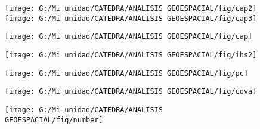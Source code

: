\documentclass[14pt]{beamer}
\begin{document}
\begin{frame}
  \begin{figure}
    \centering
    \texttt{[image: G:/Mi unidad/CATEDRA/ANALISIS GEOESPACIAL/fig/cap2]}
     \texttt{[image: G:/Mi unidad/CATEDRA/ANALISIS GEOESPACIAL/fig/cap3]}
  \end{figure}
\tiny{}
\end{frame}
\begin{frame}
  \begin{figure}
    \centering
    \texttt{[image: G:/Mi unidad/CATEDRA/ANALISIS GEOESPACIAL/fig/cap]}
  \end{figure}
\tiny{}
\end{frame}
\begin{frame}
  \begin{figure}
    \centering
    \texttt{[image: G:/Mi unidad/CATEDRA/ANALISIS GEOESPACIAL/fig/ihs2]}
  \end{figure}
\tiny{}
\end{frame}
\begin{frame}
  \begin{figure}
    \centering
    \texttt{[image: G:/Mi unidad/CATEDRA/ANALISIS GEOESPACIAL/fig/pc]}
  \end{figure}
\tiny{}
\end{frame}
\begin{frame}
  \begin{figure}
    \centering
    \texttt{[image: G:/Mi unidad/CATEDRA/ANALISIS GEOESPACIAL/fig/cova]}
  \end{figure}
\tiny{}
\end{frame}
\begin{frame}
  \begin{figure}
    \centering
    \texttt{[image: G:/Mi unidad/CATEDRA/ANALISIS GEOESPACIAL/fig/number]}
  \end{figure}
\tiny{}
\end{frame}
\end{document}
